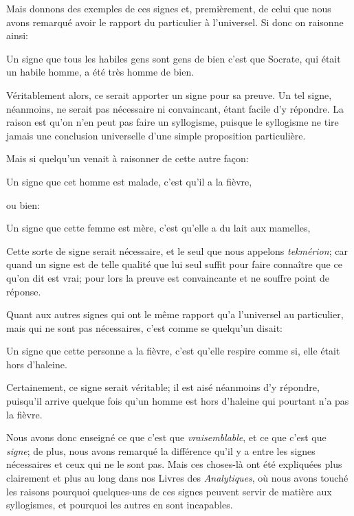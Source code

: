 \bigbreak

Mais donnons des exemples de ces signes et, premièrement, de celui que nous avons remarqué avoir le rapport du particulier à l'universel. Si donc on
raisonne ainsi:

\begin{emphpar}
	Un signe que tous les habiles gens sont gens de bien c'est que Socrate, qui était un habile homme, a été très homme de bien.
\end{emphpar}

Véritablement alors, ce serait apporter un signe pour sa preuve. Un tel signe, néanmoins, ne serait pas nécessaire ni convaincant, étant facile
d'y répondre. La raison est qu'on n'en peut pas faire un syllogisme, puisque le syllogisme ne tire jamais une conclusion universelle d'une simple
proposition particulière.

Mais si quelqu'un venait à raisonner de cette autre façon:

\begin{emphpar}
	Un signe que cet homme est malade, c'est qu'il a la fièvre,
\end{emphpar}

ou bien:

\begin{emphpar}
	Un signe que cette femme est mère, c'est qu'elle a du lait aux mamelles,
\end{emphpar}

Cette sorte de signe serait nécessaire, et le seul que nous appelons \emph{tekmérion}; car quand un signe est de telle qualité que lui seul suffit
pour faire connaître que ce qu'on dit est vrai; pour lors la preuve est convaincante et ne souffre point de réponse.

Quant aux autres signes qui ont le même rapport qu'a l'universel au particulier, mais qui ne sont pas nécessaires, c'est comme se quelqu'un disait:

\begin{emphpar}
	Un signe que cette personne a la fièvre, c'est qu'elle respire comme si, elle était hors d'haleine.
\end{emphpar}

Certainement, ce signe serait véritable; il est aisé néanmoins d'y répondre, puisqu'il arrive quelque fois qu'un homme est hors d'haleine qui
pourtant n'a pas la fièvre.

\bigbreak

Nous avons donc enseigné ce que c'est que \emph{vraisemblable}, et ce que c'est que \emph{signe}; de plus, nous avons remarqué la différence qu'il y
a entre les signes nécessaires et ceux qui ne le sont pas. Mais ces choses-là ont été expliquées plus clairement et plus au long dans nos Livres des
\emph{Analytiques}, où nous avons touché les raisons pourquoi quelques-uns de ces signes peuvent servir de matière aux syllogismes, et pourquoi les
autres en sont incapables.

